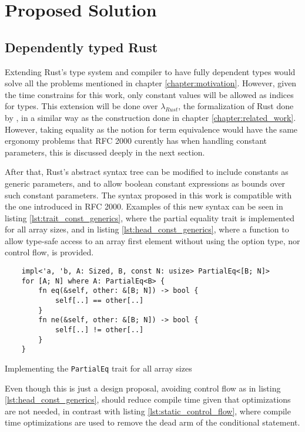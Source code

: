 \chapter{Proposed Solution}
\label{chapter:proposed_solution}

\section{Dependently typed Rust}

Extending Rust's type system and compiler to have fully dependent types would
solve all the problems mentioned in chapter \ref{chapter:motivation}. However,
given the time constrains for this work, only constant values will be allowed as
indices for types. This extension will be done over $\lambda_{Rust}$, the
formalization of Rust done by \citet{ralf}, in a similar way as the construction
done in chapter \ref{chapter:related_work}. However, taking equality as the
notion for term equivalence would have the same ergonomy problems that RFC 2000
curently has when handling constant parameters, this is discussed deeply in the
next section.

After that, Rust's abstract syntax tree can be modified to include constants as
generic parameters, and to allow boolean constant expressions as bounds over
such constant parameters. The syntax proposed in this work is compatible with
the one introduced in RFC 2000. Examples of this new syntax can be seen in
listing \ref{lst:trait_const_generics}, where the partial equality trait is
implemented for all array sizes, and in listing \ref{lst:head_const_generics},
where a function to allow type-safe access to an array first element without
using the option type, nor control flow, is provided. 

\begin{listing}[ht]
	\begin{verbatim}
    impl<'a, 'b, A: Sized, B, const N: usize> PartialEq<[B; N]> 
    for [A; N] where A: PartialEq<B> {
        fn eq(&self, other: &[B; N]) -> bool {
            self[..] == other[..]
        }
        fn ne(&self, other: &[B; N]) -> bool {
            self[..] != other[..]
        }
    }
	\end{verbatim}
    \caption{Implementing the \texttt{PartialEq} trait for all array sizes}
  \label{lst:trait_const_generics}
\end{listing}

Even though this is just a design proposal, avoiding control flow as in listing
\ref{lst:head_const_generics}, should reduce compile time given that
optimizations are not needed, in contrast with listing
\ref{lst:static_control_flow}, where compile time optimizations are used to
remove the dead arm of the conditional statement.

